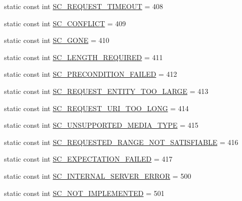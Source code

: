 \begin{DoxyCompactItemize}
\item 
static const int \hyperlink{class_c_w_f_1_1_http_servlet_response_a29ed43b08cfdbd12308fe925b8af19b7}{S\+C\+\_\+\+R\+E\+Q\+U\+E\+S\+T\+\_\+\+T\+I\+M\+E\+O\+U\+T} = 408
\item 
static const int \hyperlink{class_c_w_f_1_1_http_servlet_response_aff39227c80ce7554ffc4d14744566936}{S\+C\+\_\+\+C\+O\+N\+F\+L\+I\+C\+T} = 409
\item 
static const int \hyperlink{class_c_w_f_1_1_http_servlet_response_ac946b14d07ec4dd5424dda38cc880583}{S\+C\+\_\+\+G\+O\+N\+E} = 410
\item 
static const int \hyperlink{class_c_w_f_1_1_http_servlet_response_a5cc3ca43e4d370b061e7ce6e97482dad}{S\+C\+\_\+\+L\+E\+N\+G\+T\+H\+\_\+\+R\+E\+Q\+U\+I\+R\+E\+D} = 411
\item 
static const int \hyperlink{class_c_w_f_1_1_http_servlet_response_a2fe48d8d392c2cfd94a0675788408120}{S\+C\+\_\+\+P\+R\+E\+C\+O\+N\+D\+I\+T\+I\+O\+N\+\_\+\+F\+A\+I\+L\+E\+D} = 412
\item 
static const int \hyperlink{class_c_w_f_1_1_http_servlet_response_a8d57cc28cb13ec139ed6b868b70685c6}{S\+C\+\_\+\+R\+E\+Q\+U\+E\+S\+T\+\_\+\+E\+N\+T\+I\+T\+Y\+\_\+\+T\+O\+O\+\_\+\+L\+A\+R\+G\+E} = 413
\item 
static const int \hyperlink{class_c_w_f_1_1_http_servlet_response_ad5658c613e105fcbce10d1f811ea06c5}{S\+C\+\_\+\+R\+E\+Q\+U\+E\+S\+T\+\_\+\+U\+R\+I\+\_\+\+T\+O\+O\+\_\+\+L\+O\+N\+G} = 414
\item 
static const int \hyperlink{class_c_w_f_1_1_http_servlet_response_af01704b03a9a6d0c1eb7d4e55001517f}{S\+C\+\_\+\+U\+N\+S\+U\+P\+P\+O\+R\+T\+E\+D\+\_\+\+M\+E\+D\+I\+A\+\_\+\+T\+Y\+P\+E} = 415
\item 
static const int \hyperlink{class_c_w_f_1_1_http_servlet_response_ada85982e99aa27adb1c7c3e62d85ae15}{S\+C\+\_\+\+R\+E\+Q\+U\+E\+S\+T\+E\+D\+\_\+\+R\+A\+N\+G\+E\+\_\+\+N\+O\+T\+\_\+\+S\+A\+T\+I\+S\+F\+I\+A\+B\+L\+E} = 416
\item 
static const int \hyperlink{class_c_w_f_1_1_http_servlet_response_a6c788faebc283d58933d369d28541b4f}{S\+C\+\_\+\+E\+X\+P\+E\+C\+T\+A\+T\+I\+O\+N\+\_\+\+F\+A\+I\+L\+E\+D} = 417
\item 
static const int \hyperlink{class_c_w_f_1_1_http_servlet_response_aa405174745632134d866115233de2371}{S\+C\+\_\+\+I\+N\+T\+E\+R\+N\+A\+L\+\_\+\+S\+E\+R\+V\+E\+R\+\_\+\+E\+R\+R\+O\+R} = 500
\item 
static const int \hyperlink{class_c_w_f_1_1_http_servlet_response_a28f408dd0f15a6e20b995dbde6a3901a}{S\+C\+\_\+\+N\+O\+T\+\_\+\+I\+M\+P\+L\+E\+M\+E\+N\+T\+E\+D} = 501

\end{DoxyCompactItemize}
